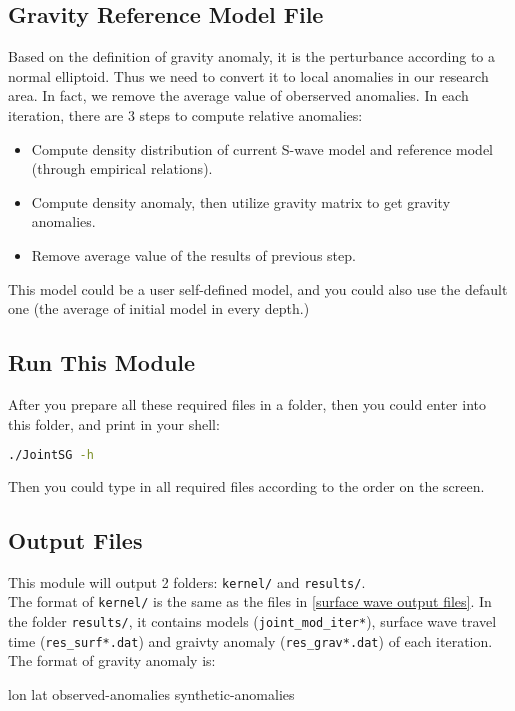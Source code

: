 \documentclass[UTF8]{article}
\begin{document}
    \subsection{Gravity Reference Model File}
    Based on the definition of gravity anomaly, it is the perturbance according 
    to a normal elliptoid. Thus we need to convert it to local anomalies in our research 
    area. In fact, we remove the average value of oberserved anomalies. In each iteration, 
    there are 3 steps to compute relative anomalies:
    \begin{itemize}
        \item Compute density distribution of current S-wave model and reference model (through
            empirical relations).
        \item Compute density anomaly, then utilize gravity matrix to get gravity anomalies.
        \item Remove average value of the results of previous step.
    \end{itemize}
    This model could be a user self-defined model, and you could also use the 
    default one (the average of initial model in every depth.)

    \subsection{Run This Module}
    After you prepare all these required files in a folder, then you could enter into this folder,
    and print in your shell:
    \begin{lstlisting}[language=bash]
    ./JointSG -h
    \end{lstlisting}
    Then you could type in all required files according to the order on the screen.

    \subsection{Output Files}
    This module will output 2 folders: \verb!kernel/! and \verb!results/!. \\

    The format of \verb!kernel/! is the same as the files in \ref{surface wave output files}.
    In the folder \verb!results/!, it contains models (\verb!joint_mod_iter*!), 
    surface wave travel time (\verb!res_surf*.dat!) and graivty anomaly (\verb!res_grav*.dat!) 
    of each iteration. The format of gravity anomaly is:
    \begin{center}
        lon lat observed-anomalies synthetic-anomalies
    \end{center}
\end{document}
